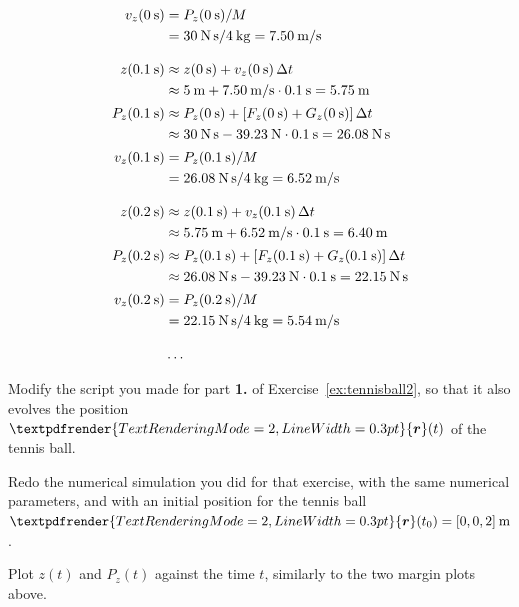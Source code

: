 \documentclass[a4paper,12pt,%
onecolumn,oneside,titlepage,%
british%
]{memoir}
\renewcommand*{\bm}[1]{\textpdfrender{TextRenderingMode=2,LineWidth=0.3pt}{\boldsymbol{#1}}}
\newcommand*{\incr}{\Delta}%
\renewcommand*{\|}[1][]{\nonscript\:#1\vert\nonscript\:\mathopen{}}
\newcommand*{\yr}{\bm{r}}
\newcommand*{\yM}{M}%
\newcommand*{\Dt}{\incr t}
\begin{document}
\begin{equation*}
  \begin{aligned}
    v_{z}(\qty{0}{s}) &= P_{z}(\qty{0}{s})/\yM\\
    &=\qty{30}{N\,s}/\qty{4}{kg} = \qty{7.50}{m/s}
    \\[3\jot]
    z(\qty{0.1}{s})  &\approx z(\qty{0}{s}) + v_{z}(\qty{0}{s})\,\Dt\\
    &\approx \qty{5}{m} + \qty{7.50}{m/s}\cdot\qty{0.1}{s} = \qty{5.75}{m}\\[0.5\jot]
    P_{z}(\qty{0.1}{s})  &\approx P_{z}(\qty{0}{s}) + [F_{z}(\qty{0}{s}) + G_{z}(\qty{0}{s})]\,\Dt \\
    &\approx\qty{30}{N\,s} -\qty{39.23}{N}\cdot\qty{0.1}{s} = \qty{26.08}{N\,s} \\[0.5\jot]
    v_{z}(\qty{0.1}{s}) &= P_{z}(\qty{0.1}{s})/\yM\\
    &=\qty{26.08}{N\,s}/\qty{4}{kg} = \qty{6.52}{m/s}
    \\[3\jot]
    z(\qty{0.2}{s})  &\approx z(\qty{0.1}{s}) + v_{z}(\qty{0.1}{s})\,\Dt\\
    &\approx \qty{5.75}{m} + \qty{6.52}{m/s}\cdot\qty{0.1}{s} = \qty{6.40}{m}\\[0.5\jot]
    P_{z}(\qty{0.2}{s})  &\approx P_{z}(\qty{0.1}{s}) + [F_{z}(\qty{0.1}{s}) + G_{z}(\qty{0.1}{s})]\,\Dt\\
    &\approx\qty{26.08}{N\,s} -\qty{39.23}{N}\cdot\qty{0.1}{s} = \qty{22.15}{N\,s} \\[0.5\jot]
    v_{z}(\qty{0.2}{s}) &= P_{z}(\qty{0.2}{s})/\yM\\
    &=\qty{22.15}{N\,s}/\qty{4}{kg} = \qty{5.54}{m/s}
    \\[3\jot]
    &\dotso
  \end{aligned}
\end{equation*}

\begin{exercise}[label={ex:tennisball3}]
  Modify the script you made for part \textbf{1.} of Exercise~\ref{ex:tennisball2}, so that it also evolves the position $\yr(t)$ of the tennis ball.

  Redo the numerical simulation you did for that exercise, with the same numerical parameters, and with an initial position for the tennis ball $\yr(t_{0}) = [0,0,2]\:\unit{m}$.

  Plot $z(t)$ and $P_{z}(t)$ against the time $t$, similarly to the two margin plots above.
\end{exercise}
\end{document}
